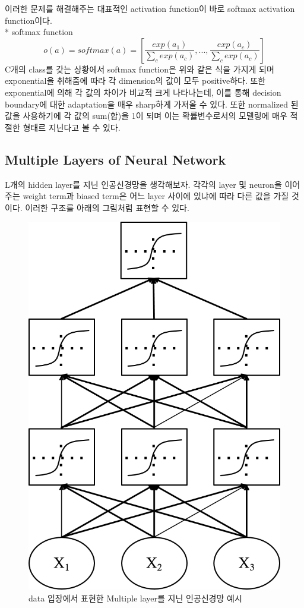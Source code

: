 \documentclass[draft=false]{oblivoir}
\begin{document}
이러한 문제를 해결해주는 대표적인 activation function이 바로 softmax activation function이다.\\

* softmax function
\begin{equation}
o(a) = softmax(a) = [\frac{exp(a_{1})}{\sum_{c}exp(a_{c})},...,\frac{exp(a_{c})}{\sum_{c}exp(a_{c})}]
\label{eq:14-2-12}
\end{equation}
C개의 class를 갖는 상황에서 softmax function은 위와 같은 식을 가지게 되며 exponential을 취해줌에 따라 각 dimension의 값이 모두 positive하다. 또한 exponential에 의해 각 값의 차이가 비교적 크게 나타나는데, 이를 통해 decision boundary에 대한 adaptation을 매우 sharp하게 가져올 수 있다. 또한 normalized 된 값을 사용하기에 각 값의 sum(합)을 1이 되며 이는 확률변수로서의 모델링에 매우 적절한 형태르 지닌다고 볼 수 있다.
\subsection{Multiple Layers of Neural Network}
L개의 hidden layer를 지닌 인공신경망을 생각해보자. 각각의 layer 및 neuron을 이어주는 weight term과 biased term은 어느 layer 사이에 있냐에 따라 다른 값을 가질 것이다. 이러한 구조를 아래의 그림처럼 표현할 수 있다.
\begin{figure}[ht] \centering 
\includegraphics[scale=0.5]{fig14_19.png} 
\caption{data 입장에서 표현한 Multiple layer를 지닌 인공신경망 예시}
\label{fig:14-18}
\end{figure}
\end{document}
